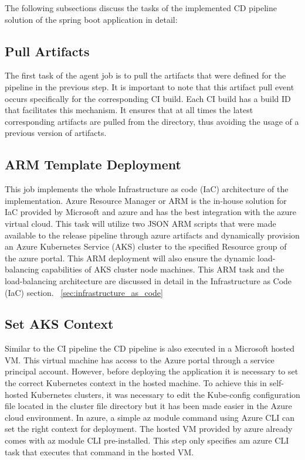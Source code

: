 The following subsections discuss the tasks of the implemented CD pipeline solution of the spring boot application in detail:

\subsection{Pull Artifacts}
The first task of the agent job is to pull the artifacts that were defined for the pipeline in the previous step. It is important to note that this artifact pull event occurs specifically for the corresponding CI build. Each CI build has a build ID that facilitates this mechanism. It ensures that at all times the latest corresponding artifacts are pulled from the directory, thus avoiding the usage of a previous version of artifacts. 

\subsection{ARM Template Deployment}
This job implements the whole Infrastructure as code (IaC) architecture of the implementation. Azure Resource Manager or ARM is the in-house solution for IaC provided by Microsoft and azure and has the best integration with the azure virtual cloud. This task will utilize two JSON ARM scripts that were made available to the release pipeline through azure artifacts and dynamically provision an Azure Kubernetes Service (AKS) cluster to the specified Resource group of the azure portal. This ARM deployment will also ensure the dynamic load-balancing capabilities of AKS cluster node machines. This ARM task and the load-balancing architecture are discussed in detail in the Infrastructure as Code (IaC) section. ~\ref{sec:infrastructure_as_code}

\subsection{Set AKS Context}
Similar to the CI pipeline the CD pipeline is also executed in a Microsoft hosted VM. This virtual machine has access to the Azure portal through a service principal account. However, before deploying the application it is necessary to set the correct Kubernetes context in the hosted machine. To achieve this in self-hosted Kubernetes clusters, it was necessary to edit the Kube-config configuration file located in the cluster file directory but it has been made easier in the Azure cloud environment. In azure, a simple az module command using Azure CLI can set the right context for deployment. The hosted VM provided by azure already comes with az module CLI pre-installed. This step only specifies am azure CLI task that executes that command in the hosted VM. 

